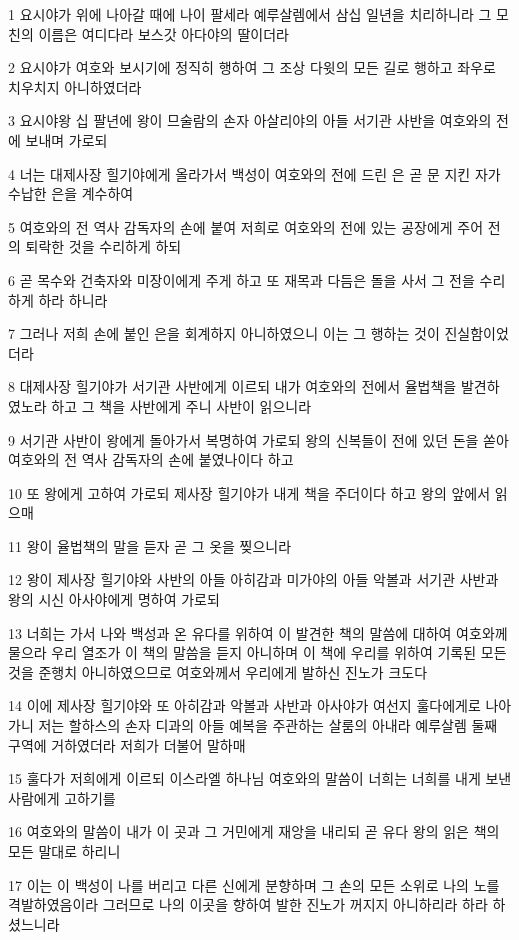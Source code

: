 \par 1 요시야가 위에 나아갈 때에 나이 팔세라 예루살렘에서 삼십 일년을 치리하니라 그 모친의 이름은 여디다라 보스갓 아다야의 딸이더라
\par 2 요시야가 여호와 보시기에 정직히 행하여 그 조상 다윗의 모든 길로 행하고 좌우로 치우치지 아니하였더라
\par 3 요시야왕 십 팔년에 왕이 므술람의 손자 아살리야의 아들 서기관 사반을 여호와의 전에 보내며 가로되
\par 4 너는 대제사장 힐기야에게 올라가서 백성이 여호와의 전에 드린 은 곧 문 지킨 자가 수납한 은을 계수하여
\par 5 여호와의 전 역사 감독자의 손에 붙여 저희로 여호와의 전에 있는 공장에게 주어 전의 퇴락한 것을 수리하게 하되
\par 6 곧 목수와 건축자와 미장이에게 주게 하고 또 재목과 다듬은 돌을 사서 그 전을 수리하게 하라 하니라
\par 7 그러나 저희 손에 붙인 은을 회계하지 아니하였으니 이는 그 행하는 것이 진실함이었더라
\par 8 대제사장 힐기야가 서기관 사반에게 이르되 내가 여호와의 전에서 율법책을 발견하였노라 하고 그 책을 사반에게 주니 사반이 읽으니라
\par 9 서기관 사반이 왕에게 돌아가서 복명하여 가로되 왕의 신복들이 전에 있던 돈을 쏟아 여호와의 전 역사 감독자의 손에 붙였나이다 하고
\par 10 또 왕에게 고하여 가로되 제사장 힐기야가 내게 책을 주더이다 하고 왕의 앞에서 읽으매
\par 11 왕이 율법책의 말을 듣자 곧 그 옷을 찢으니라
\par 12 왕이 제사장 힐기야와 사반의 아들 아히감과 미가야의 아들 악볼과 서기관 사반과 왕의 시신 아사야에게 명하여 가로되
\par 13 너희는 가서 나와 백성과 온 유다를 위하여 이 발견한 책의 말씀에 대하여 여호와께 물으라 우리 열조가 이 책의 말씀을 듣지 아니하며 이 책에 우리를 위하여 기록된 모든 것을 준행치 아니하였으므로 여호와께서 우리에게 발하신 진노가 크도다
\par 14 이에 제사장 힐기야와 또 아히감과 악볼과 사반과 아사야가 여선지 훌다에게로 나아가니 저는 할하스의 손자 디과의 아들 예복을 주관하는 살룸의 아내라 예루살렘 둘째 구역에 거하였더라 저희가 더불어 말하매
\par 15 훌다가 저희에게 이르되 이스라엘 하나님 여호와의 말씀이 너희는 너희를 내게 보낸 사람에게 고하기를
\par 16 여호와의 말씀이 내가 이 곳과 그 거민에게 재앙을 내리되 곧 유다 왕의 읽은 책의 모든 말대로 하리니
\par 17 이는 이 백성이 나를 버리고 다른 신에게 분향하며 그 손의 모든 소위로 나의 노를 격발하였음이라 그러므로 나의 이곳을 향하여 발한 진노가 꺼지지 아니하리라 하라 하셨느니라
